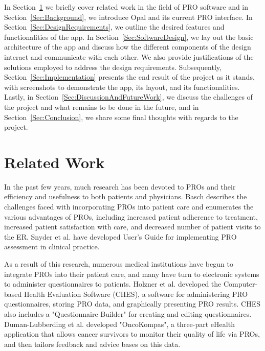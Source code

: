 \documentclass{higrep}
\newcommand{\sectionref}[1]{Section~\ref{#1}}
\begin{document}
In \sectionref{Sec:RelatedWork} we briefly cover related work in the field of PRO software and in \sectionref{Sec:Background}, we introduce Opal and its current PRO interface. In \sectionref{Sec:DesignRequirements}, we outline the desired features and functionalities of the app. In \sectionref{Sec:SoftwareDesign}, we lay out the basic architecture of the app and discuss how the different components of the design interact and communicate with each other. We also provide justifications of the solutions employed to address the design requirements. Subsequently, \sectionref{Sec:Implementation} presents the end result of the project as it stands, with screenshots to demonstrate the app, its layout, and its functionalities. Lastly, in \sectionref{Sec:DiscussionAndFutureWork}, we discuss the challenges of the project and what remains to be done in the future, and in \sectionref{Sec:Conclusion}, we share some final thoughts with regards to the project.

\chapter{Related Work}\label{Sec:RelatedWork}


In the past few years, much research has been devoted to PROs and their efficiency and usefulness to both patients and physicians. Basch describes the challenges faced with incorporating PROs into patient care\cite{basch17} and enumerates the various advantages of PROs, including increased patient adherence to treatment, increased patient satisfaction with care, and decreased number of patient visits to the ER. Snyder et al. have developed User's Guide for implementing PRO assessment in clinical practice\cite{snyder12}.

As a result of this research, numerous medical institutions have begun to integrate PROs into their patient care, and many have turn to electronic systems to administer questionnaires to patients. Holzner et al. developed the Computer-based Health Evaluation Software (CHES), a software for administering PRO questionnaires, storing PRO data, and graphically presenting PRO results. CHES also includes a "Questionnaire Builder" for creating and editing questionnaires\cite{holzner12}. Duman-Lubberding et al. developed "OncoKompas", a three-part eHealth application that allows cancer survivors to monitor their quality of life via PROs, and then tailors feedback and advice bases on this data\cite{dl16}.
\end{document}
